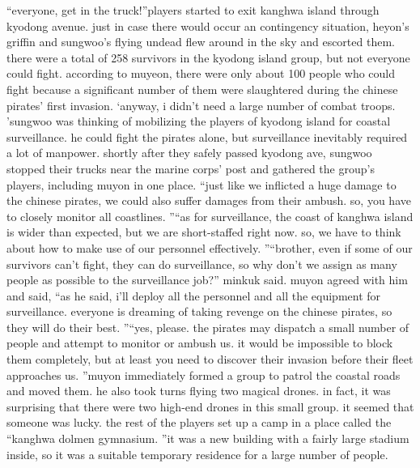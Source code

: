 “everyone, get in the truck!”players started to exit kanghwa island through kyodong avenue.
 just in case there would occur an contingency situation, heyon’s griffin and sungwoo’s flying undead flew around in the sky and escorted them.
there were a total of 258 survivors in the kyodong island group, but not everyone could fight.
according to muyeon, there were only about 100 people who could fight because a significant number of them were slaughtered during the chinese pirates’ first invasion.
‘anyway, i didn’t need a large number of combat troops.
’sungwoo was thinking of mobilizing the players of kyodong island for coastal surveillance.
 he could fight the pirates alone, but surveillance inevitably required a lot of manpower.
shortly after they safely passed kyodong ave, sungwoo stopped their trucks near the marine corps’ post and gathered the group’s players, including muyon in one place.
“just like we inflicted a huge damage to the chinese pirates, we could also suffer damages from their ambush.
 so, you have to closely monitor all coastlines.
”“as for surveillance, the coast of kanghwa island is wider than expected, but we are short-staffed right now.
 so, we have to think about how to make use of our personnel effectively.
”“brother, even if some of our survivors can’t fight, they can do surveillance, so why don’t we assign as many people as possible to the surveillance job?” minkuk said.
muyon agreed with him and said, “as he said, i’ll deploy all the personnel and all the equipment for surveillance.
 everyone is dreaming of taking revenge on the chinese pirates, so they will do their best.
”“yes, please.
 the pirates may dispatch a small number of people and attempt to monitor or ambush us.
 it would be impossible to block them completely, but at least you need to discover their invasion before their fleet approaches us.
”muyon immediately formed a group to patrol the coastal roads and moved them.
 he also took turns flying two magical drones.
 in fact, it was surprising that there were two high-end drones in this small group.
 it seemed that someone was lucky.
the rest of the players set up a camp in a place called the “kanghwa dolmen gymnasium.
”it was a new building with a fairly large stadium inside, so it was a suitable temporary residence for a large number of people.


 